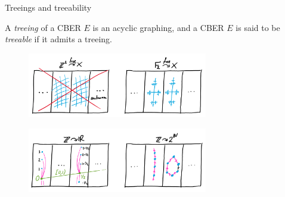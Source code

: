 \documentclass{beamer}
\begin{document}
    \begin{frame}{Treeings and treeability}
        \begin{definition}
            A \textit{treeing} of a CBER $E$ is an acyclic graphing, and a CBER $E$ is said to be \textit{treeable} if it admits a treeing.
        \end{definition}

        \vspace{-0.14in}

        \begin{figure}[h]
            \center
            \includegraphics[width=0.7\textwidth]{img/not_treeable.png}
        \end{figure}
        \vspace{-0.2in}
        \begin{figure}[h]
            \center
            \includegraphics[width=0.7\textwidth]{img/smooth_hyperfinite.png}
        \end{figure}
    \end{frame}
\end{document}
